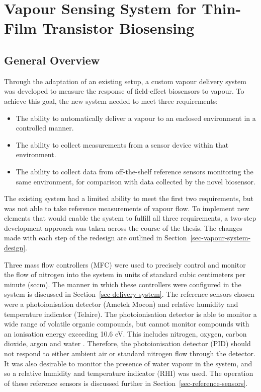 \documentclass[
  a4paper,
]{scrbook}
\begin{document}

\hypertarget{sec-vapour-sensing-biosensors}{%
\chapter{Vapour Sensing System for Thin-Film Transistor
Biosensing}\label{sec-vapour-sensing-biosensors}}

\hypertarget{general-overview-1}{%
\section{General Overview}\label{general-overview-1}}

Through the adaptation of an existing setup, a custom vapour delivery
system was developed to measure the response of field-effect biosensors
to vapour. To achieve this goal, the new system needed to meet three
requirements:

\begin{itemize}
\item
  The ability to automatically deliver a vapour to an enclosed
  environment in a controlled manner.
\item
  The ability to collect measurements from a sensor device within that
  environment.
\item
  The ability to collect data from off-the-shelf reference sensors
  monitoring the same environment, for comparison with data collected by
  the novel biosensor.
\end{itemize}

The existing system had a limited ability to meet the first two
requirements, but was not able to take reference measurements of vapour
flow. To implement new elements that would enable the system to fulfill
all three requirements, a two-step development approach was taken across
the course of the thesis. The changes made with each step of the
redesign are outlined in Section~\ref{sec-vapour-system-design}.

Three mass flow controllers (MFC) were used to precisely control and
monitor the flow of nitrogen into the system in units of standard cubic
centimeters per minute (sccm). The manner in which these controllers
were configured in the system is discussed in
Section~\ref{sec-delivery-system}. The reference sensors chosen were a
photoionisation detector (Ametek Mocon) and relative humidity and
temperature indicator (Telaire). The photoionisation detector is able to
monitor a wide range of volatile organic compounds, but cannot monitor
compounds with an ionisation energy exceeding 10.6 eV. This includes
nitrogen, oxygen, carbon dioxide, argon and water
\autocite{PIDmanual,Ionscience}. Therefore, the photoionisation detector
(PID) should not respond to either ambient air or standard nitrogen flow
through the detector. It was also desirable to monitor the presence of
water vapour in the system, and so a relative humidity and temperature
indicator (RHI) was used. The operation of these reference sensors is
discussed further in Section~\ref{sec-reference-sensors}.
\end{document}
